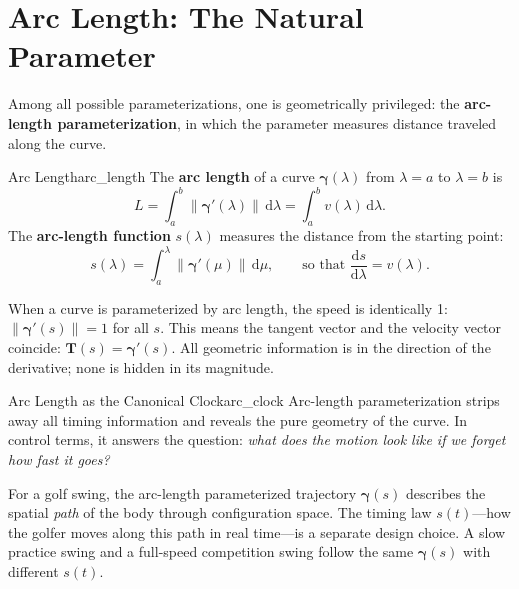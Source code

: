 \documentclass[12pt, openany]{book}
\theoremstyle{plain}
\newcommand{\traj}{\bm{\gamma}}
\newcommand{\dd}{\mathrm{d}}
\newcommand{\norm}[1]{\left\lVert #1 \right\rVert}
\newcommand{\tangent}{\bm{T}}
\begin{document}
\section{Arc Length: The Natural Parameter}

Among all possible parameterizations, one is geometrically privileged: the
\textbf{arc-length parameterization}, in which the parameter measures distance
traveled along the curve.

\begin{definition}{Arc Length}{arc_length}
  The \textbf{arc length} of a curve $\traj(\lambda)$ from $\lambda = a$ to
  $\lambda = b$ is
  \begin{equation}\label{eq:arc_length}
    L = \int_a^b \norm{\traj'(\lambda)} \, \dd\lambda
    = \int_a^b v(\lambda) \, \dd\lambda.
  \end{equation}
  The \textbf{arc-length function} $s(\lambda)$ measures the distance from the
  starting point:
  \begin{equation}
    s(\lambda) = \int_a^{\lambda} \norm{\traj'(\mu)} \, \dd\mu,
    \qquad \text{so that } \frac{\dd s}{\dd\lambda} = v(\lambda).
  \end{equation}
\end{definition}

When a curve is parameterized by arc length, the speed is identically 1:
$\norm{\traj'(s)} = 1$ for all $s$. This means the tangent vector and the velocity
vector coincide: $\tangent(s) = \traj'(s)$. All geometric information is in the
direction of the derivative; none is hidden in its magnitude.

\begin{principle}{Arc Length as the Canonical Clock}{arc_clock}
  Arc-length parameterization strips away all timing information and reveals
  the pure geometry of the curve. In control terms, it answers the question:
  \emph{what does the motion look like if we forget how fast it goes?}

  For a golf swing, the arc-length parameterized trajectory $\traj(s)$
  describes the spatial \emph{path} of the body through configuration space.
  The timing law $s(t)$---how the golfer moves along this path in real
  time---is a separate design choice. A slow practice swing and a full-speed
  competition swing follow the same $\traj(s)$ with different $s(t)$.
\end{principle}
\end{document}
